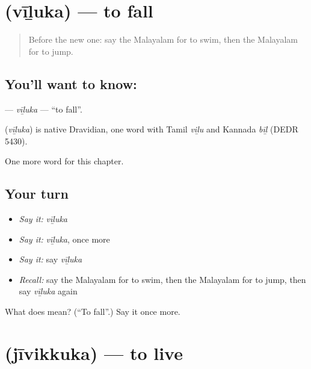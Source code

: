 \section[\texorpdfstring{\ml{വീഴുക} (vīḻuka)}{വീഴുക (vīḻuka)}]{ (vīḻuka) — to fall}

\label{lesson:ML-C176-viluka}



\begin{quote}
Before the new one: say the Malayalam for to swim, then the Malayalam for to jump.
\end{quote}

\subsection*{You'll want to know: }
\textbf{} — \emph{vīḻuka} — \textquotedblleft{}to fall\textquotedblright{}.

\begin{cousinweb}
\textbf{} (\emph{vīḻuka}) is native Dravidian, one word with Tamil \emph{viḻu} and Kannada \emph{bīḻ} (DEDR 5430).
\end{cousinweb}

\begin{grammarlens}[title={What you've built}]
One more word for this chapter.
\end{grammarlens}

\subsection*{Your turn}
\begin{itemize}
\raggedright
  \item \emph{Say it:} \emph{vīḻuka}
  \item \emph{Say it:} \emph{vīḻuka}, once more
  \item \emph{Say it:} say \emph{vīḻuka}
  \item \emph{Recall:} say the Malayalam for to swim, then the Malayalam for to jump, then say \emph{vīḻuka} again
\end{itemize}

\begin{tcolorbox}[breakable,colback=teal!4,colframe=teal!35!black,title={Before you move on}]
What does  mean? (\textquotedblleft{}To fall\textquotedblright{}.) Say it once more.
\end{tcolorbox}
\section[\texorpdfstring{\ml{ജീവിക്കുക} (jīvikkuka)}{ജീവിക്കുക (jīvikkuka)}]{ (jīvikkuka) — to live}

